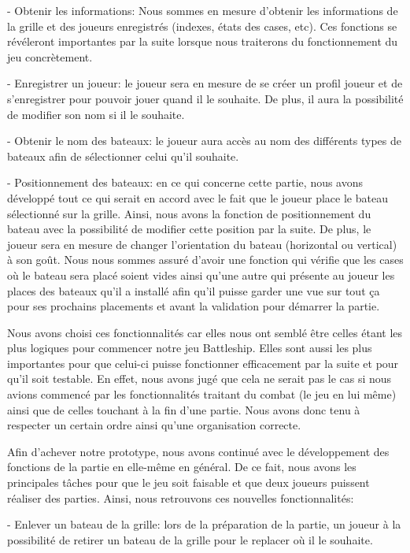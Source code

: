 \documentclass[12pt]{article}
\begin{document}
- Obtenir les informations: Nous sommes en mesure d'obtenir les informations de la grille et des joueurs enregistrés (indexes, états des cases, etc). Ces fonctions se révéleront importantes par la suite lorsque nous traiterons du fonctionnement du jeu concrètement.

- Enregistrer un joueur: le joueur sera en mesure de se créer un profil joueur et de s'enregistrer pour pouvoir jouer quand il le souhaite. De plus, il aura la possibilité de modifier son nom si il le souhaite.

- Obtenir le nom des bateaux: le joueur aura accès au nom des différents types de bateaux afin de sélectionner celui qu'il souhaite.

- Positionnement des bateaux: en ce qui concerne cette partie, nous avons développé tout ce qui serait en accord avec le fait que le joueur place le bateau sélectionné sur la grille. Ainsi, nous avons la fonction de positionnement du bateau avec la possibilité de modifier cette position par la suite. De plus, le joueur sera en mesure de changer l'orientation du bateau (horizontal ou vertical) à son goût. Nous nous sommes assuré d'avoir une fonction qui vérifie que les cases où le bateau sera placé soient vides ainsi qu'une autre qui présente au joueur les places des bateaux qu'il a installé afin qu'il puisse garder une vue sur tout ça pour ses prochains placements et avant la validation pour démarrer la partie.


Nous avons choisi ces fonctionnalités car elles nous ont semblé être celles étant les plus logiques pour commencer notre jeu Battleship. Elles sont aussi les plus importantes pour que celui-ci puisse fonctionner efficacement par la suite et pour qu'il soit testable. En effet, nous avons jugé que cela ne serait pas le cas si nous avions commencé par les fonctionnalités traitant du combat (le jeu en lui même) ainsi que de celles touchant à la fin d'une partie. Nous avons donc tenu à respecter un certain ordre ainsi qu'une organisation correcte.

Afin d'achever notre prototype, nous avons continué avec le développement des fonctions de la partie en elle-même en général. De ce fait, nous avons les principales tâches pour que le jeu soit faisable et que deux joueurs puissent réaliser des parties. Ainsi, nous retrouvons ces nouvelles fonctionnalités:

- Enlever un bateau de la grille: lors de la préparation de la partie, un joueur à la possibilité de retirer un bateau de la grille pour le replacer où il le souhaite.
\end{document}
